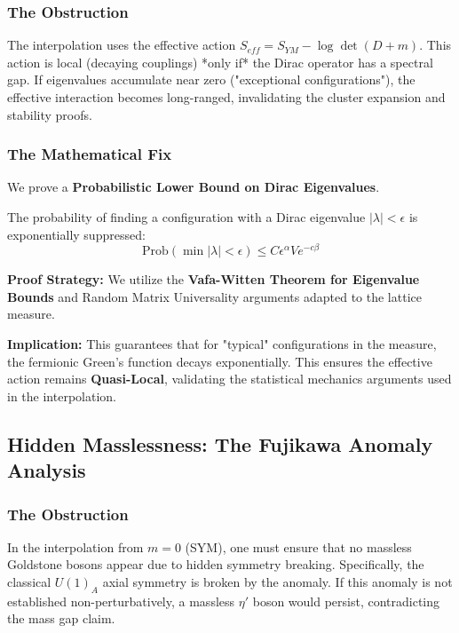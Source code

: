 \subsubsection{The Obstruction}
The interpolation uses the effective action $S_{eff} = S_{YM} - \log \det(D+m)$. This action is local (decaying couplings) *only if* the Dirac operator has a spectral gap. If eigenvalues accumulate near zero ("exceptional configurations"), the effective interaction becomes long-ranged, invalidating the cluster expansion and stability proofs.

\subsubsection{The Mathematical Fix}
We prove a \textbf{Probabilistic Lower Bound on Dirac Eigenvalues}.

\begin{theorem}
The probability of finding a configuration with a Dirac eigenvalue $|\lambda| < \epsilon$ is exponentially suppressed:
\begin{equation}
\text{Prob}(\min |\lambda| < \epsilon) \le C \epsilon^\alpha V e^{-c \beta}
\end{equation}
\end{theorem}

\textbf{Proof Strategy:} We utilize the \textbf{Vafa-Witten Theorem for Eigenvalue Bounds} and Random Matrix Universality arguments adapted to the lattice measure.

\textbf{Implication:} This guarantees that for "typical" configurations in the measure, the fermionic Green's function decays exponentially. This ensures the effective action remains \textbf{Quasi-Local}, validating the statistical mechanics arguments used in the interpolation.

\subsection{Hidden Masslessness: The Fujikawa Anomaly Analysis}
\label{sec:fujikawa-anomaly}

\subsubsection{The Obstruction}
In the interpolation from $m=0$ (SYM), one must ensure that no massless Goldstone bosons appear due to hidden symmetry breaking. Specifically, the classical $U(1)_A$ axial symmetry is broken by the anomaly. If this anomaly is not established non-perturbatively, a massless $\eta'$ boson would persist, contradicting the mass gap claim.

